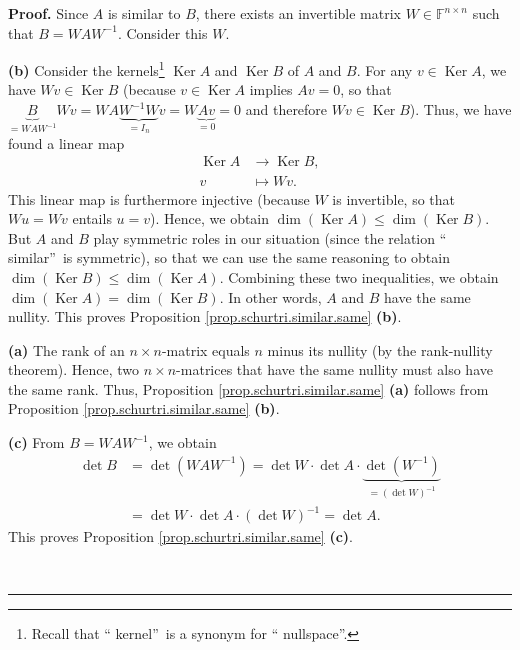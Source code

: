 \documentclass[numbers=enddot,12pt,final,onecolumn,notitlepage]{scrartcl}%
\numberwithin{exer}{subsection}
\theoremstyle{definition}
\newenvironment{proof}[1][Proof]{\noindent\textbf{#1.} }{\ \rule{0.5em}{0.5em}}
\begin{document}
\begin{proof}
Since $A$ is similar to $B$, there exists an invertible matrix $W\in
\mathbb{F}^{n\times n}$ such that $B=WAW^{-1}$. Consider this $W$. \medskip

\textbf{(b)} Consider the kernels\footnote{Recall that \textquotedblleft
kernel\textquotedblright\ is a synonym for \textquotedblleft
nullspace\textquotedblright.} $\operatorname*{Ker}A$ and $\operatorname*{Ker}%
B$ of $A$ and $B$. For any $v\in\operatorname*{Ker}A$, we have $Wv\in
\operatorname*{Ker}B$ (because $v\in\operatorname*{Ker}A$ implies $Av=0$, so
that $\underbrace{B}_{=WAW^{-1}}Wv=WA\underbrace{W^{-1}W}_{=I_{n}%
}v=W\underbrace{Av}_{=0}=0$ and therefore $Wv\in\operatorname*{Ker}B$). Thus,
we have found a linear map%
\begin{align*}
\operatorname*{Ker}A  &  \rightarrow\operatorname*{Ker}B,\\
v  &  \mapsto Wv.
\end{align*}
This linear map is furthermore injective (because $W$ is invertible, so that
$Wu=Wv$ entails $u=v$). Hence, we obtain $\dim\left(  \operatorname*{Ker}%
A\right)  \leq\dim\left(  \operatorname*{Ker}B\right)  $. But $A$ and $B$ play
symmetric roles in our situation (since the relation \textquotedblleft
similar\textquotedblright\ is symmetric), so that we can use the same
reasoning to obtain $\dim\left(  \operatorname*{Ker}B\right)  \leq\dim\left(
\operatorname*{Ker}A\right)  $. Combining these two inequalities, we obtain
$\dim\left(  \operatorname*{Ker}A\right)  =\dim\left(  \operatorname*{Ker}%
B\right)  $. In other words, $A$ and $B$ have the same nullity. This proves
Proposition \ref{prop.schurtri.similar.same} \textbf{(b)}. \medskip

\textbf{(a)} The rank of an $n\times n$-matrix equals $n$ minus its nullity
(by the rank-nullity theorem). Hence, two $n\times n$-matrices that have the
same nullity must also have the same rank. Thus, Proposition
\ref{prop.schurtri.similar.same} \textbf{(a)} follows from Proposition
\ref{prop.schurtri.similar.same} \textbf{(b)}. \medskip

\textbf{(c)} From $B=WAW^{-1}$, we obtain%
\begin{align*}
\det B  &  =\det\left(  WAW^{-1}\right)  =\det W\cdot\det A\cdot
\underbrace{\det\left(  W^{-1}\right)  }_{=\left(  \det W\right)  ^{-1}}\\
&  =\det W\cdot\det A\cdot\left(  \det W\right)  ^{-1}=\det A.
\end{align*}
This proves Proposition \ref{prop.schurtri.similar.same} \textbf{(c)}.
\medskip


\end{proof}
\end{document}
